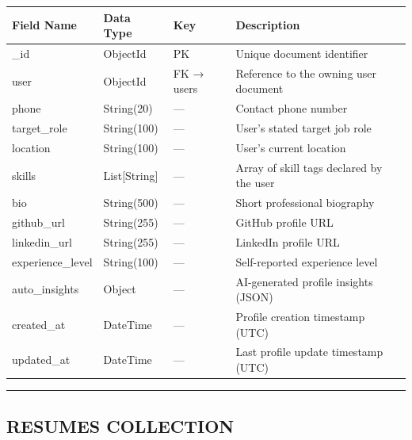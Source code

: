 \documentclass[12pt]{article}
\begin{document}
\begin{longtable}{|p{}|p{}|p{}|p{}|}
\hline
\textbf{Field Name} & \textbf{Data Type} & \textbf{Key} & \textbf{Description} \\ \hline
\endhead
\_id & ObjectId & PK & Unique document identifier \\ \hline
user & ObjectId & FK → users & Reference to the owning user document \\ \hline
phone & String(20) & — & Contact phone number \\ \hline
target\_role & String(100) & — & User's stated target job role \\ \hline
location & String(100) & — & User's current location \\ \hline
skills & List[String] & — & Array of skill tags declared by the user \\ \hline
bio & String(500) & — & Short professional biography \\ \hline
github\_url & String(255) & — & GitHub profile URL \\ \hline
linkedin\_url & String(255) & — & LinkedIn profile URL \\ \hline
experience\_level & String(100) & — & Self-reported experience level \\ \hline
auto\_insights & Object & — & AI-generated profile insights (JSON) \\ \hline
created\_at & DateTime & — & Profile creation timestamp (UTC) \\ \hline
updated\_at & DateTime & — & Last profile update timestamp (UTC) \\ \hline
\end{longtable}


\noindent\rule{\textwidth}{0.4pt}

\subsection{RESUMES COLLECTION}
\end{document}
